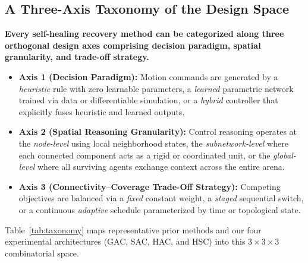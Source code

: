 \documentclass[11pt]{article}
\theoremstyle{plain}
\theoremstyle{definition}
\theoremstyle{remark}
\begin{document}
\subsection{A Three-Axis Taxonomy of the Design Space}
\label{sec:taxonomy}
\textbf{Every self-healing recovery method can be categorized along three orthogonal design axes comprising decision paradigm, spatial granularity, and trade-off strategy.}
\begin{itemize}[nosep]
  \item \textbf{Axis 1 (Decision Paradigm):} Motion commands are generated by a \emph{heuristic} rule with zero learnable parameters, a \emph{learned} parametric network trained via data or differentiable simulation, or a \emph{hybrid} controller that explicitly fuses heuristic and learned outputs.
  \item \textbf{Axis 2 (Spatial Reasoning Granularity):} Control reasoning operates at the \emph{node-level} using local neighborhood states, the \emph{subnetwork-level} where each connected component acts as a rigid or coordinated unit, or the \emph{global-level} where all surviving agents exchange context across the entire arena.
  \item \textbf{Axis 3 (Connectivity--Coverage Trade-Off Strategy):} Competing objectives are balanced via a \emph{fixed} constant weight, a \emph{staged} sequential switch, or a continuous \emph{adaptive} schedule parameterized by time or topological state.
\end{itemize}
Table~\ref{tab:taxonomy} maps representative prior methods and our four experimental architectures (GAC, SAC, HAC, and HSC) into this $3 \times 3 \times 3$ combinatorial space.
\end{document}
